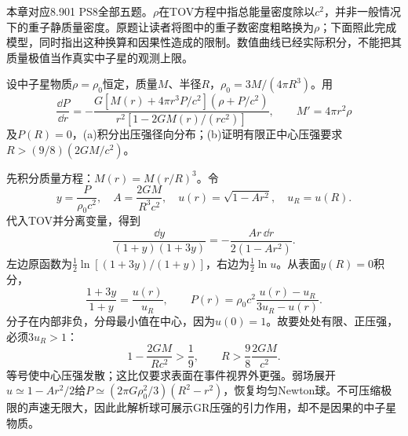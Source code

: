 本章对应8.901 PS8全部五题。$\rho$在TOV方程中指总能量密度除以$c^2$，并非一般情况下的重子静质量密度。原题让读者将图中的重子数密度粗略换为$\rho$；下面照此完成模型，同时指出这种换算和因果性造成的限制。数值曲线已经实际积分，不能把其质量极值当作真实中子星的观测上限。

\begin{exercise}
设中子星物质$\rho=\rho_0$恒定，质量$M$、半径$R$，$\rho_0=3M/(4\pi R^3)$。用
\[
 \frac{\dd P}{\dd r}
 =-\frac{G[M(r)+4\pi r^3P/c^2](\rho+P/c^2)}
 {r^2[1-2GM(r)/(rc^2)]},\qquad
 M'=4\pi r^2\rho
\]
及$P(R)=0$，(a)积分出压强径向分布；(b)证明有限正中心压强要求$R>(9/8)(2GM/c^2)$。
\end{exercise}
\begin{solution}
先积分质量方程：$M(r)=M(r/R)^3$。令
\[
 y=\frac P{\rho_0c^2},\quad A=\frac{2GM}{R^3c^2},\quad
 u(r)=\sqrt{1-Ar^2},\quad u_R=u(R).
\]
代入TOV并分离变量，得到
\[
 \frac{\dd y}{(1+y)(1+3y)}
 =-\frac{A r\,\dd r}{2(1-Ar^2)}.
\]
左边原函数为$\tfrac12\ln[(1+3y)/(1+y)]$，右边为$\tfrac12\ln u$。从表面$y(R)=0$积分，
\[
 \frac{1+3y}{1+y}=\frac{u(r)}{u_R},
 \qquad
 P(r)=\rho_0c^2\frac{u(r)-u_R}{3u_R-u(r)}.
\]
分子在内部非负，分母最小值在中心，因为$u(0)=1$。故要处处有限、正压强，必须$3u_R>1$：
\[
 1-\frac{2GM}{Rc^2}>\frac19,\qquad
 R>\frac98\frac{2GM}{c^2}.
\]
等号使中心压强发散；这比仅要求表面在事件视界外更强。弱场展开$u\simeq1-Ar^2/2$给$P\simeq(2\pi G\rho_0^2/3)(R^2-r^2)$，恢复均匀Newton球。不可压缩极限的声速无限大，因此此解析球可展示GR压强的引力作用，却不是因果的中子星物质。
\end{solution}

